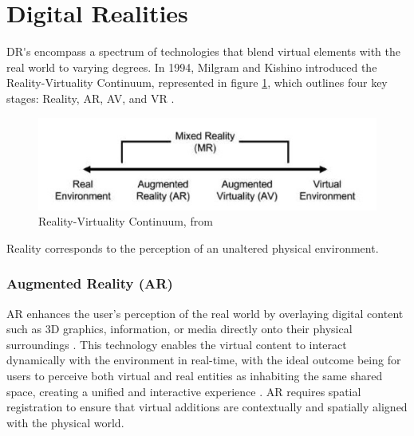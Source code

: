 
\section{Digital Realities} 

\ac{DR's} encompass a spectrum of technologies that blend virtual elements with the real world to varying degrees. 
In 1994, Milgram and Kishino introduced the Reality-Virtuality Continuum, represented in figure \ref{f:real-virtual-continuum}, which outlines four key stages: Reality, \ac{AR}, \ac{AV}, and \ac{VR} \cite{milgram1994}.

\begin{figure}[h]
    \centering
    \includegraphics[width=0.6\linewidth]{figs/mixed-reality-continuum.jpg}
    \caption{Reality-Virtuality Continuum, from \cite{milgram1994}}
    \label{f:real-virtual-continuum}
\end{figure}

Reality corresponds to the perception of an unaltered physical environment.

\subsubsection{Augmented Reality (\ac{AR})}
    \ac{AR} enhances the user's perception of the real world by overlaying digital content such as 3D graphics, information, or media directly 
    onto their physical surroundings \cite{liu2022digitaltwin}. 
    This technology enables the virtual content to interact dynamically with the environment in real-time, with the ideal outcome being for users
    to perceive both virtual and real entities as inhabiting the same shared space, creating a unified and interactive experience \cite{Azuma1997}.
    \ac{AR} requires spatial registration to ensure that virtual additions are contextually and spatially aligned with the physical world.

